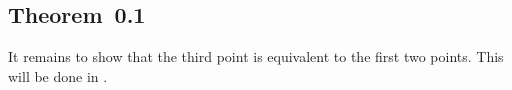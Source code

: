 \subsection{Theorem~0.1}

It remains to show that the third point is equivalent to the first two points.
This will be done in .
